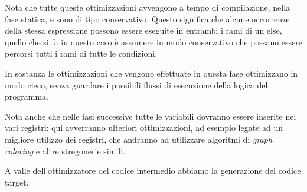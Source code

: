 \documentclass[class=book, crop=false, oneside, 12pt]{standalone}
\begin{document}
Nota che tutte queste ottimizzazioni avvengono a tempo di compilazione, nella fase statica, e sono di tipo conservativo. Questo significa che alcune occorrenze della stessa espressione possono essere eseguite in entrambi i rami di un else, quello che si fa in questo caso è assumere in modo conservativo che possano essere percorsi tutti i rami di tutte le condizioni.

In sostanza le ottimizzazioni che vengono effettuate in questa fase ottimizzano in modo cieco, senza guardare i possibili flussi di esecuzione della logica del programma.

Nota anche che nelle fasi successive tutte le variabili dovranno essere inserite nei vari registri: qui avverranno ulteriori ottimizzazioni, ad esempio legate ad un migliore utilizzo dei registri, che andranno ad utilizzare algoritmi di \emph{graph coloring} e altre stregonerie simili.

A valle dell'ottimizzatore del codice intermedio abbiamo la generazione del codice target.
\end{document}
